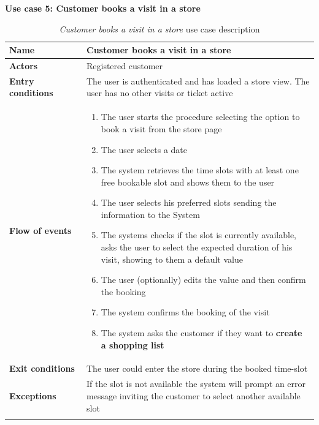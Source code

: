 \clearpage
\textbf{Use case 5: Customer books a visit in a store}
\smallskip
{}
\begin{longtable}{p{0.25\linewidth}p{0.75\linewidth}}
    \toprule
    \textbf{Name}             & \textbf{Customer books a visit in a store}                                                           \\
    \midrule
    \textbf{Actors}           & Registered customer                                                                                  \\
    \midrule
    \textbf{Entry conditions} & The user is authenticated and has loaded a store view. The user has no other visits or ticket active \\
    \midrule
    \textbf{Flow of events}   &
    \begin{enumerate}
        \item The user starts the procedure selecting the option to book a visit from the store page
        \item The user selects a date
        \item The system retrieves the time slots with at least one free bookable slot and shows them to the user
        \item The user selects his preferred slots sending the information to the System
        \item The systems checks if the slot is currently available, asks the user to select the expected duration of his visit, showing to them a default value
        \item The user (optionally) edits the value and then confirm the booking
        \item The system confirms the booking of the visit
        \item The system asks the customer if they want to \textbf{create a shopping list}
    \end{enumerate}                                                                                                       \\
    \midrule
    \textbf{Exit conditions}  & The user could enter the store during the booked time-slot                                           \\
    \midrule
    \textbf{Exceptions} & If the slot is not available the system will prompt an error message inviting the customer to select another available slot                                     \\
    \bottomrule
    \caption{\emph{Customer books a visit in a store} use case description}
\end{longtable}

